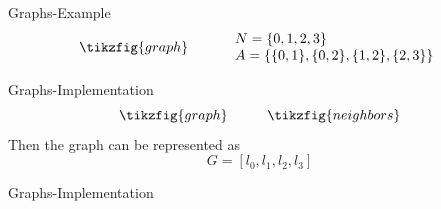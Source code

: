 \documentclass{beamer}
\begin{document}
%
\begin{frame}{Graphs-Example}
	\[
		\tikzfig{graph} \hspace{1cm}
		\begin{array}{l}
			N = \{0, 1, 2, 3\}\\
			A =
			\{
				\{0,1\}, \{0,2\}, \{1,2\}, \{2,3\}
			\}
		\end{array}
	\]
\end{frame}
%
\begin{frame}{Graphs-Implementation}
	\[
		\tikzfig{graph}
		\hspace{1cm}
		\tikzfig{neighbors}
	\]
	Then the graph can be represented as
	\[
		G= [l_0, l_1, l_2, l_3]
	\]
\end{frame}
%
\begin{frame}{Graphs-Implementation}
	
\end{frame}
\end{document}
